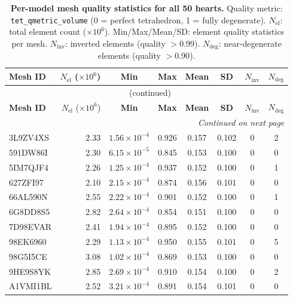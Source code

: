 \iffalse %
\begin{landscape}
\begin{longtable}{lrcccccc}
\caption{
    \textbf{Per-model mesh quality statistics for all 50 hearts.}
    Quality metric: \texttt{tet\_qmetric\_volume} (0 = perfect tetrahedron,
    1 = fully degenerate). $N_{\text{el}}$: total element count
    ($\times 10^6$). Min/Max/Mean/SD: element quality statistics per mesh.
    $N_{\text{inv}}$: inverted elements (quality $> 0.99$).
    $N_{\text{deg}}$: near-degenerate elements (quality $> 0.90$).
}
\label{tab:s7-mesh-quality} \\
\toprule
\textbf{Mesh ID} &
    $N_{\text{el}}$ ($\times 10^6$) &
    \textbf{Min} &
    \textbf{Max} &
    \textbf{Mean} &
    \textbf{SD} &
    $N_{\text{inv}}$ &
    $N_{\text{deg}}$ \\
\midrule
\endfirsthead
\multicolumn{8}{c}{\tablename\ \thetable{} (continued)} \\
\toprule
\textbf{Mesh ID} &
    $N_{\text{el}}$ ($\times 10^6$) &
    \textbf{Min} &
    \textbf{Max} &
    \textbf{Mean} &
    \textbf{SD} &
    $N_{\text{inv}}$ &
    $N_{\text{deg}}$ \\
\midrule
\endhead
\midrule
\multicolumn{8}{r}{\textit{Continued on next page}} \\
\endfoot
\bottomrule
\endlastfoot
3L9ZV4XS & 2.33 & $1.56\times10^{-4}$ & 0.926 & 0.157 & 0.102 & 0 & 2 \\
591DW86I  & 2.30 & $6.15\times10^{-5}$ & 0.845 & 0.153 & 0.100 & 0 & 0 \\
5IM7QJF4  & 2.26 & $1.25\times10^{-4}$ & 0.937 & 0.152 & 0.100 & 0 & 1 \\
627ZFI97  & 2.10 & $2.15\times10^{-4}$ & 0.874 & 0.156 & 0.101 & 0 & 0 \\
66AL590N  & 2.55 & $2.22\times10^{-4}$ & 0.901 & 0.152 & 0.100 & 0 & 1 \\
6G8DD8S5  & 2.82 & $2.64\times10^{-4}$ & 0.854 & 0.151 & 0.100 & 0 & 0 \\
7D98EVAR  & 2.41 & $1.94\times10^{-4}$ & 0.895 & 0.152 & 0.100 & 0 & 0 \\
98EK6960  & 2.29 & $1.13\times10^{-4}$ & 0.950 & 0.155 & 0.101 & 0 & 5 \\
98G5I5CE  & 3.08 & $1.02\times10^{-4}$ & 0.869 & 0.153 & 0.100 & 0 & 0 \\
9HE9S8YK  & 2.85 & $2.69\times10^{-4}$ & 0.910 & 0.154 & 0.100 & 0 & 2 \\
A1VMI1BL  & 2.52 & $3.21\times10^{-4}$ & 0.891 & 0.154 & 0.101 & 0 & 0 \\

\end{longtable}
\end{landscape}

